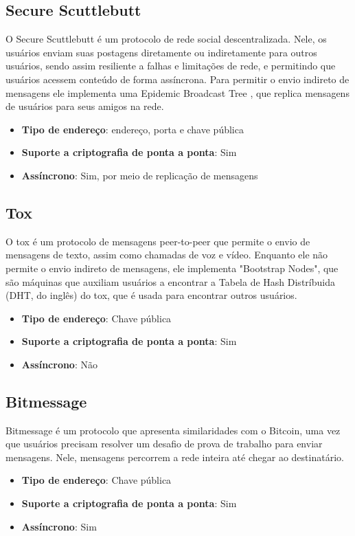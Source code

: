 \subsection{Secure Scuttlebutt}

O Secure Scuttlebutt é um protocolo de rede social descentralizada. Nele, os usuários enviam suas postagens diretamente ou indiretamente para outros usuários, sendo assim resiliente a falhas e limitações de rede, e permitindo que usuários acessem conteúdo de forma assíncrona. Para permitir o envio indireto de mensagens ele implementa uma Epidemic Broadcast Tree \cite{ebtpaper}, que replica mensagens de usuários para seus amigos na rede. \cite{scuttlebutt}
\cite{scuttlebutt}

\begin{itemize}
  \item \textbf{Tipo de endereço}: endereço, porta e chave pública
  \item \textbf{Suporte a criptografia de ponta a ponta}: Sim
  \item \textbf{Assíncrono}: Sim, por meio de replicação de mensagens
\end{itemize}

\subsection{Tox}

O tox é um protocolo de mensagens peer-to-peer que permite o envio de mensagens de texto, assim como chamadas de voz e vídeo. Enquanto ele não permite o envio indireto de mensagens, ele implementa "Bootstrap Nodes", que são máquinas que auxiliam usuários a encontrar a Tabela de Hash Distríbuida (DHT, do inglês) do tox, que é usada para encontrar outros usuários. \cite{toxcore}

\begin{itemize}
  \item \textbf{Tipo de endereço}: Chave pública
  \item \textbf{Suporte a criptografia de ponta a ponta}: Sim
  \item \textbf{Assíncrono}: Não
\end{itemize}

\subsection{Bitmessage}

Bitmessage é um protocolo que apresenta similaridades com o Bitcoin, uma vez que usuários precisam resolver um desafio de prova de trabalho para enviar mensagens. Nele, mensagens percorrem a rede inteira até chegar ao destinatário. \cite{bitmessage}

\begin{itemize}
  \item \textbf{Tipo de endereço}: Chave pública
  \item \textbf{Suporte a criptografia de ponta a ponta}: Sim
  \item \textbf{Assíncrono}: Sim
\end{itemize}

